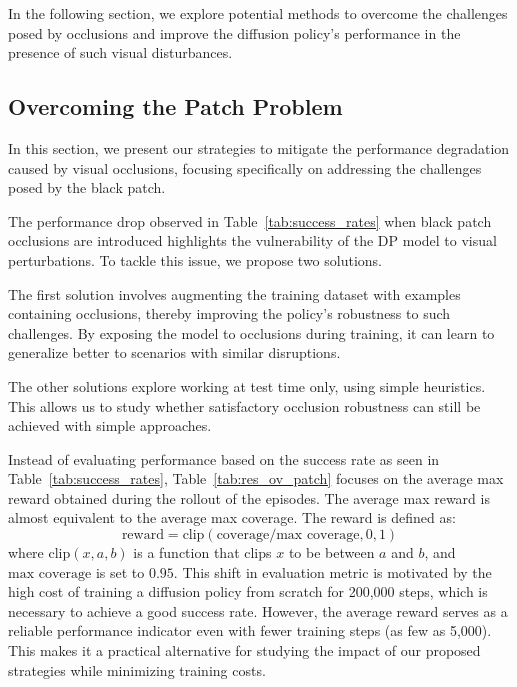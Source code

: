 In the following section, we explore potential methods to overcome the challenges posed by occlusions and improve the diffusion policy's performance in the presence of such visual disturbances.



\subsection{Overcoming the Patch Problem}\label{sec:solve_pb}

In this section, we present our strategies to mitigate the performance degradation caused by visual occlusions, focusing specifically on addressing the challenges posed by the black patch.

The performance drop observed in Table~\ref{tab:success_rates} when black patch occlusions are introduced highlights the vulnerability of the DP model to visual perturbations.
To tackle this issue, we propose two solutions.

The first solution involves augmenting the training dataset with examples containing occlusions, thereby improving the policy's robustness to such challenges.
By exposing the model to occlusions during training, it can learn to generalize better to scenarios with similar disruptions.

The other solutions explore working at test time only, using simple heuristics.
This allows us to study whether satisfactory occlusion robustness can still be achieved with simple approaches.

Instead of evaluating performance based on the success rate as seen in Table~\ref{tab:success_rates}, Table~\ref{tab:res_ov_patch}
focuses on the average max reward obtained during the rollout of the episodes.
The average max reward is almost equivalent to the average max coverage. The reward is defined as:
$$
\text{reward} = \text{clip}\left(\text{coverage} / \text{max coverage}, 0, 1\right)
$$
where $\text{clip}(x, a, b)$ is a function that clips $x$ to be between $a$ and $b$, and $\text{max coverage}$
is set to $0.95$.
This shift in evaluation metric is motivated by the high cost of training a diffusion policy from scratch for 200,000 steps, which is necessary to achieve a good success rate.
However, the average reward serves as a reliable performance indicator even with fewer training steps (as few as 5,000).
This makes it a practical alternative for studying the impact of our proposed strategies while minimizing training costs.

